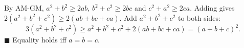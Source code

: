 By AM-GM, $a^2+b^2\ge2ab$, $b^2+c^2\ge2bc$ and $c^2+a^2\ge2ca$. Adding gives $2(a^2+b^2+c^2)\ge2(ab+bc+ca)$. Add $a^2+b^2+c^2$ to both sides:
\[3(a^2+b^2+c^2)\ge a^2+b^2+c^2+2(ab+bc+ca)=(a+b+c)^2.\]
$\blacksquare$ Equality holds iff $a=b=c$.
